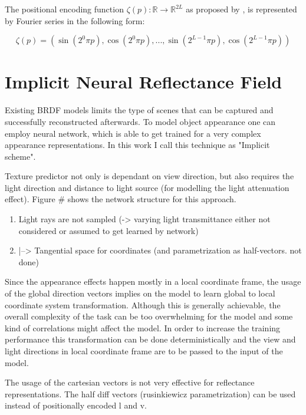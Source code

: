 The positional encoding function $\zeta(p) : \mathbb{R} \xrightarrow{} \mathbb{R}^{2L}$ as proposed by \cite{mildenhall2020nerf}, \cite{vaswani2017attention} is represented by Fourier series in the following form:

\begin{equation}
    \zeta(p) = (\sin(2^0\pi p), \cos(2^0\pi p), ..., \sin(2^{L-1}\pi p), \cos(2^{L-1}\pi p))
\end{equation}



\section{Implicit Neural Reflectance Field}

Existing BRDF models limits the type of scenes that can be captured
and successfully reconstructed afterwards.
To model object appearance one can employ neural network, which is able to get trained for a very complex appearance representations.
In this work I  call this technique as "Implicit scheme".

Texture predictor not only is dependant on view direction,
but also requires the light direction and distance to light source
(for modelling the light attenuation effect).
Figure \# shows the network structure for this approach.

\begin{enumerate}
    \item Light rays are not sampled (-> varying light transmittance either not considered or assumed to get learned by network)
    \item |--> Tangential space for coordinates (and parametrization as half-vectors. not done)
\end{enumerate}

Since the appearance effects happen mostly in a local coordinate frame, the usage of the global direction vectors implies on the model to learn global to local coordinate system transformation. Although this is generally achievable, the overall complexity of the task can be too overwhelming for the model and some kind of correlations might affect the model. In order to increase the training performance this transformation can be done deterministically and the view and light directions in local coordinate frame are to be passed to the input of the model.

The usage of the cartesian vectors is not very effective for reflectance representations. The half diff vectors (rusinkiewicz parametrization) can be used instead of positionally encoded l and v.




